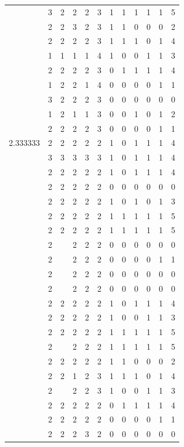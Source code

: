 \documentclass[]{book}
\theoremstyle{definition}
\theoremstyle{definition}
\theoremstyle{definition}
\theoremstyle{remark}
\begin{document}
\begin{table}
{\begin{tabular}[t]{rrrrrrrrrrrr}
 & 3 & 2 & 2 & 2 & 3 & 1 & 1 & 1 & 1 & 1 & 5\\
 & 2 & 2 & 3 & 2 & 3 & 1 & 1 & 0 & 0 & 0 & 2\\
 & 2 & 2 & 2 & 2 & 3 & 1 & 1 & 1 & 0 & 1 & 4\\
 & 1 & 1 & 1 & 1 & 4 & 1 & 0 & 0 & 1 & 1 & 3\\
 & 2 & 2 & 2 & 2 & 3 & 0 & 1 & 1 & 1 & 1 & 4\\
 & 1 & 2 & 2 & 1 & 4 & 0 & 0 & 0 & 0 & 1 & 1\\
 & 3 & 2 & 2 & 2 & 3 & 0 & 0 & 0 & 0 & 0 & 0\\
 & 1 & 2 & 1 & 1 & 3 & 0 & 0 & 1 & 0 & 1 & 2\\
 & 2 & 2 & 2 & 2 & 3 & 0 & 0 & 0 & 0 & 1 & 1\\
2.333333 & 2 & 2 & 2 & 2 & 2 & 1 & 0 & 1 & 1 & 1 & 4\\
 & 3 & 3 & 3 & 3 & 3 & 1 & 0 & 1 & 1 & 1 & 4\\
 & 2 & 2 & 2 & 2 & 2 & 1 & 0 & 1 & 1 & 1 & 4\\
 & 2 & 2 & 2 & 2 & 2 & 0 & 0 & 0 & 0 & 0 & 0\\
 & 2 & 2 & 2 & 2 & 2 & 1 & 0 & 1 & 0 & 1 & 3\\
 & 2 & 2 & 2 & 2 & 2 & 1 & 1 & 1 & 1 & 1 & 5\\
 & 2 & 2 & 2 & 2 & 2 & 1 & 1 & 1 & 1 & 1 & 5\\
 & 2 &  & 2 & 2 & 2 & 0 & 0 & 0 & 0 & 0 & 0\\
 & 2 &  & 2 & 2 & 2 & 0 & 0 & 0 & 0 & 1 & 1\\
 & 2 &  & 2 & 2 & 2 & 0 & 0 & 0 & 0 & 0 & 0\\
 & 2 &  & 2 & 2 & 2 & 0 & 0 & 0 & 0 & 0 & 0\\
 & 2 & 2 & 2 & 2 & 2 & 1 & 0 & 1 & 1 & 1 & 4\\
 & 2 & 2 & 2 & 2 & 2 & 1 & 0 & 0 & 1 & 1 & 3\\
 & 2 & 2 & 2 & 2 & 2 & 1 & 1 & 1 & 1 & 1 & 5\\
 & 2 &  & 2 & 2 & 2 & 1 & 1 & 1 & 1 & 1 & 5\\
 & 2 & 2 & 2 & 2 & 2 & 1 & 1 & 0 & 0 & 0 & 2\\
 & 2 & 2 & 1 & 2 & 3 & 1 & 1 & 1 & 0 & 1 & 4\\
 & 2 &  & 2 & 2 & 3 & 1 & 0 & 0 & 1 & 1 & 3\\
 & 2 & 2 & 2 & 2 & 2 & 0 & 1 & 1 & 1 & 1 & 4\\
 & 2 & 2 & 2 & 2 & 2 & 0 & 0 & 0 & 0 & 1 & 1\\
 & 2 & 2 & 2 & 3 & 2 & 0 & 0 & 0 & 0 & 0 & 0\\

\end{tabular}}
\end{table}
\end{document}
